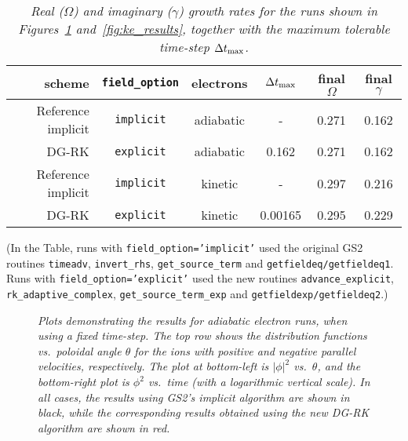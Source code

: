 \documentclass[10pt,a4paper]{article}
\begin{document}
\begin{table}[!p]
\begin{center}
\begin{tabular}{|r|c|c|c|c|c|} \hline
scheme & \texttt{field\_option} & electrons & $\Delta t_{\mbox{\scriptsize max}}$ &
final $\Omega$ & final $\gamma$ \\ \hline
Reference implicit & \texttt{implicit} & adiabatic & - & 0.271 & 0.162 \\
DG-RK & \texttt{explicit} & adiabatic & 0.162 & 0.271 & 0.162 \\ \hline
Reference implicit & \texttt{implicit} & kinetic & - & 0.297 & 0.216 \\
DG-RK & \texttt{explicit} & kinetic & 0.00165 & 0.295 & 0.229 \\ \hline
\end{tabular}
\end{center}
\caption{\textit{Real ($\Omega$) and imaginary ($\gamma$) growth rates for the
    runs shown in Figures~\ref{fig:ae_results} and~\ref{fig:ke_results},
    together with the maximum tolerable time-step $\Delta t_{\mbox{\scriptsize max}}$.}
  \label{tab:growthrates} }
\end{table}

(In the Table, runs with \texttt{field\_option='implicit'} used the original
GS2 routines \texttt{timeadv}, \texttt{invert\_rhs},
\texttt{get\_source\_term} and \texttt{getfieldeq/getfieldeq1}. Runs with
\texttt{field\_option='explicit'} used the new routines
\texttt{advance\_explicit}, \texttt{rk\_adaptive\_complex},
\texttt{get\_source\_term\_exp} and \texttt{getfieldexp/getfieldeq2}.)

\begin{figure}[!p]
  \begin{center}
  \end{center}
  \caption{\textit{Plots demonstrating the results for adiabatic electron
      runs, when using a fixed time-step. The top row shows the distribution
      functions vs.\ poloidal angle $\theta$ for the ions with positive and
      negative parallel velocities, respectively. The plot at bottom-left is
      $|\phi|^2$ vs.\ $\theta$, and the bottom-right plot is $\phi^2$ vs.\
      time (with a logarithmic vertical scale). In all cases, the results
      using GS2's implicit algorithm are shown in black, while the
      corresponding results obtained using the new DG-RK algorithm are shown
      in red.}
    \label{fig:ae_results} }
\end{figure}
\end{document}
